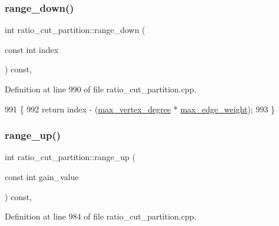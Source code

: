 \subsubsection{\texorpdfstring{range\+\_\+down()}{range\_down()}}
{\footnotesize\ttfamily int ratio\+\_\+cut\+\_\+partition\+::range\+\_\+down (\begin{DoxyParamCaption}\item[{const int}]{index }\end{DoxyParamCaption}) const\hspace{0.3cm}{\ttfamily [inline]}, {\ttfamily [protected]}}



Definition at line 990 of file ratio\+\_\+cut\+\_\+partition.\+cpp.


\begin{DoxyCode}
991 \{
992     \textcolor{keywordflow}{return} index - (\mbox{\hyperlink{classratio__cut__partition_ab07041983ab24ac059e8c98192c146e4}{max\_vertex\_degree}} * \mbox{\hyperlink{classratio__cut__partition_a74193c82e8dc7d997780613378919106}{max\_edge\_weight}});
993 \}
\end{DoxyCode}
\mbox{\label{classratio__cut__partition_a5cda26b908793b59881798d88b07344c}} 
\subsubsection{\texorpdfstring{range\+\_\+up()}{range\_up()}}
{\footnotesize\ttfamily int ratio\+\_\+cut\+\_\+partition\+::range\+\_\+up (\begin{DoxyParamCaption}\item[{const int}]{gain\+\_\+value }\end{DoxyParamCaption}) const\hspace{0.3cm}{\ttfamily [inline]}, {\ttfamily [protected]}}



Definition at line 984 of file ratio\+\_\+cut\+\_\+partition.\+cpp.


